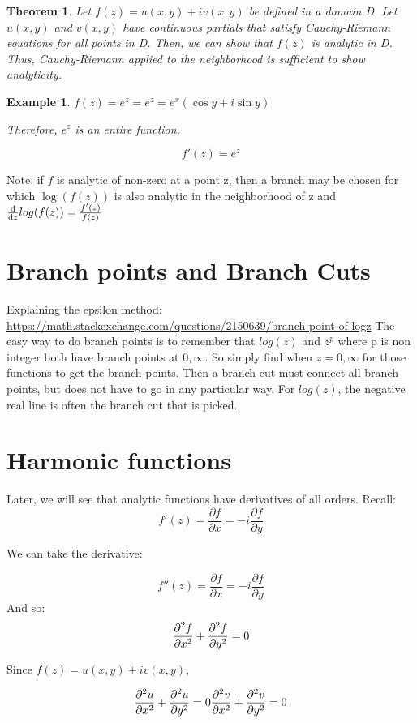 \documentclass{article}
\newtheorem{theorem}{Theorem}[section]
\newtheorem{ex}{Example}
\theoremstyle{definition}
\begin{document}
\begin{theorem}Let $f(z) = u(x,y)+iv(x,y)$  be defined in a domain D. Let $u(x,y)$ and $v(x,y)$ have continuous partials that satisfy Cauchy-Riemann equations for all points in D. Then, we can show that $f(z)$ is analytic in D. Thus, Cauchy-Riemann applied to the neighborhood is sufficient to show analyticity.
\end{theorem}

\begin{ex}
$f(z)=e^z = e^z=e^x(\cos y + i \sin y)$


Therefore, $e^z$ is an entire function. 

$$f'(z) = e^z$$
\end{ex}

Note: if $f$ is analytic of non-zero at a point z, then a branch may be chosen for which $\log (f(z))$ is also analytic in the neighborhood of z and $\dv{}{z} log(f(z)) = \frac{f'(z)}{f(z)}$


\section{Branch points and Branch Cuts}
Explaining the epsilon method: \url{https://math.stackexchange.com/questions/2150639/branch-point-of-logz}
The easy way to do branch points is to remember that $log(z)$ and $z^p$ where p is non integer both have branch points at $0, \infty$. So simply find when $z = 0, \infty$ for those functions to get the branch points. Then a branch cut must connect all branch points, but does not have to go in any particular way. For $log(z)$, the negative real line is often the branch cut that is picked.




\section{Harmonic functions}
Later, we will see that analytic functions have derivatives of all orders. Recall:
$$f'(z) = \frac{\partial f}{\partial x} = -i \frac{\partial f}{\partial y}$$

We can take the derivative:

$$f''(z) = \frac{\partial f}{\partial x} = -i \frac{\partial f}{\partial y}$$
And so:
$$\pdv{^2f}{x^2} + \pdv{^2f}{y^2} = 0$$

Since $f(z) = u(x,y) + i v(x,y)$, 

$$\pdv{^2u}{x^2} + \pdv{^2u}{y^2} = 0 \pdv{^2v}{x^2} + \pdv{^2v}{y^2} = 0$$
\end{document}
